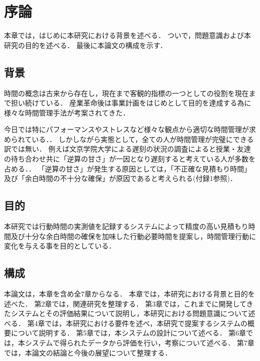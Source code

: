 \chapter{序論}
本章では，はじめに本研究における背景を述べる．
ついで，問題意識および本研究の目的を述べる．
最後に本論文の構成を示す．

\section{背景}


時間の概念は古来から存在し，現在まで客観的指標の一つとしての役割を現在まで担い続けている\cite{history}．
産業革命後は事業計画をはじめとして目的を達成する為に様々な時間管理手法が考案されてきた．


今日では特にパフォーマンスやストレスなど様々な観点から適切な時間管理が求められている．\cite{Barling1996}\cite{Britton1991}\cite{Burt1994}\cite{Macan1994}．
しかしながら実態として，全ての人が時間管理が完璧にできる訳では無い．
例えば文京学院大学による遅刻の状況の調査によると授業・友達の待ち合わせ共に「逆算の甘さ」が一因となり遅刻すると考えている人が多数を占める．\cite{bunkyo}．
「逆算の甘さ」が発生する原因としては，「不正確な見積もり時間」及び「余白時間の不十分な確保」が原因であると考えられる(付録1参照)．


\section{目的}
本研究では行動時間の実測値を記録するシステムによって精度の高い見積もり時間及び十分な余白時間の確保を加味した行動必要時間を提案し，時間管理行動に変化を与える事を目的としている．

\section{構成}
本論文は，本章を含め全7章からなる．
本章では，本研究における背景と目的を述べた．
第2章では，関連研究を整理する．
第3章では，これまでに開発してきたシステムとその評価結果について説明し，本研究における問題意識について述べる．
第4章では，本研究における要件を述べ，本研究で提案するシステムの概要について説明する．
第5章では，本システムの設計について述べる．
第6章では，本システムで得られたデータから評価を行い，考察について述べる．
第7章では，本論文の結論と今後の展望について整理する．